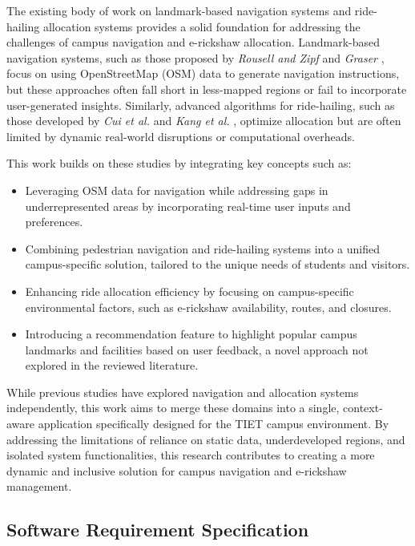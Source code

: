 The existing body of work on landmark-based navigation systems and ride-hailing allocation systems provides a solid foundation for addressing the challenges of campus navigation and e-rickshaw allocation. Landmark-based navigation systems, such as those proposed by \textit{Rousell and Zipf} \cite{rousell-2017} and \textit{Graser} \cite{graser-2017}, focus on using OpenStreetMap (OSM) data to generate navigation instructions, but these approaches often fall short in less-mapped regions or fail to incorporate user-generated insights. Similarly, advanced algorithms for ride-hailing, such as those developed by \textit{Cui et al.} \cite{cui-2022} and \textit{Kang et al.} \cite{kang-2024}, optimize allocation but are often limited by dynamic real-world disruptions or computational overheads.

This work builds on these studies by integrating key concepts such as:
\begin{itemize}
	\item Leveraging OSM data for navigation while addressing gaps in underrepresented areas by incorporating real-time user inputs and preferences.
	\item Combining pedestrian navigation and ride-hailing systems into a unified campus-specific solution, tailored to the unique needs of students and visitors.
	\item Enhancing ride allocation efficiency by focusing on campus-specific environmental factors, such as e-rickshaw availability, routes, and closures.
	\item Introducing a recommendation feature to highlight popular campus landmarks and facilities based on user feedback, a novel approach not explored in the reviewed literature.
\end{itemize}

While previous studies have explored navigation and allocation systems independently, this work aims to merge these domains into a single, context-aware application specifically designed for the TIET campus environment. By addressing the limitations of reliance on static data, underdeveloped regions, and isolated system functionalities, this research contributes to creating a more dynamic and inclusive solution for campus navigation and e-rickshaw management.

\subsection{Software Requirement Specification}

